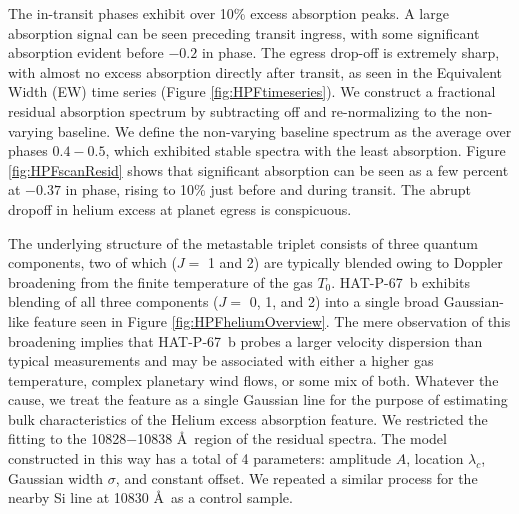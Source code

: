 \documentclass[linenumbers, twocolumn, trackchanges]{aastex631}
\begin{document}
The in-transit phases exhibit over 10\% excess absorption peaks.  A large absorption signal can be seen preceding transit ingress, with some significant absorption evident before $-0.2$ in phase.   The egress drop-off is extremely sharp, with almost no excess absorption directly after transit, as seen in the Equivalent Width (EW) time series (Figure \ref{fig:HPFtimeseries}).  We construct a fractional residual absorption spectrum by subtracting off and re-normalizing to the non-varying baseline.  We define the non-varying baseline spectrum as the average over phases $0.4-0.5$, which exhibited stable spectra with the least absorption.  Figure \ref{fig:HPFscanResid} shows that significant absorption can be seen as a few percent at $-0.37$ in phase, rising to 10\% just before and during transit. The abrupt dropoff in helium excess at planet egress is conspicuous.


The underlying structure of the metastable  triplet consists of three quantum components, two of which ($J=$ 1 and 2) are typically blended owing to Doppler broadening from the finite temperature of the gas $T_0$.  HAT-P-67~b exhibits blending of all three components ($J=$ 0, 1, and 2) into a single broad Gaussian-like feature seen in Figure \ref{fig:HPFheliumOverview}.  The mere observation of this broadening implies that HAT-P-67~b probes a larger velocity dispersion than typical measurements and may be associated with either a higher gas temperature, complex planetary wind flows, or some mix of both.  Whatever the cause, we treat the feature as a single Gaussian line for the purpose of estimating bulk characteristics of the Helium excess absorption feature.  We restricted the fitting to the 10828$-$10838 \AA~region of the residual spectra.  The model constructed in this way has a total of 4 parameters: amplitude $A$, location $\lambda_c$, Gaussian width $\sigma$, and constant offset.  We repeated a similar process for the nearby Si line at 10830 \AA~as a control sample.
\end{document}
